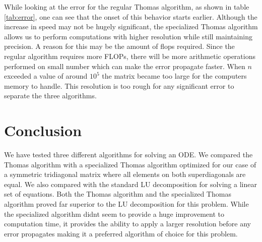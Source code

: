 \documentclass[twocolumn]{aastex62}
\begin{document}
While looking at the error for the regular Thomas algorithm, as shown in table \ref{tab:error}, one can see that the onset of this behavior starts earlier. Although the increase in speed may not be hugely significant, the specialized Thomas algorithm allows us to perform computations with higher resolution while still maintaining precision. A reason for this may be the amount of flops required. Since the regular algorithm requires more FLOPs, there will be more arithmetic operations performed on small number which can make the error propagate faster. When $n$ exceeded a value of around $10^5$ the matrix became too large for the computers memory to handle. This resolution is too rough for any significant error to separate the three algorithms.



\section{Conclusion} \label{sec:conclusion}
We have tested three different algorithms for solving an ODE. We compared the Thomas algorithm with a specialized Thomas algorithm optimized for our case of a symmetric tridiagonal matrix where all elements on both superdiagonals are equal. We also compared with the standard LU decomposition for solving a linear set of equations. Both the Thomas algorithm and the specialized Thomas algorithm proved far superior to the LU decomposition for this problem. While the specialized algorithm didnt seem to provide a huge improvement to computation time, it provides the ability to apply a larger resolution before any error propagates making it a preferred algorithm of choice for this problem.




\end{document}
